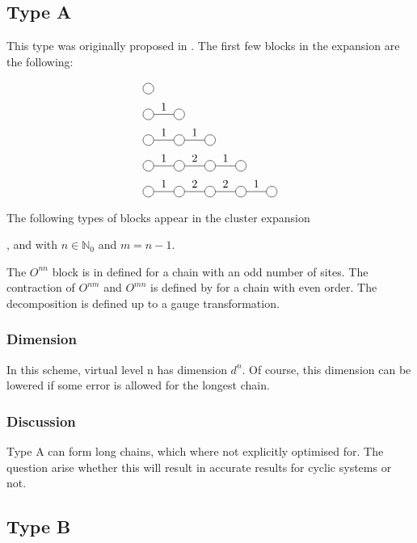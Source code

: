 
\subsection{Type A}
This type was originally proposed in \cite{Vanhecke2021}. The first few blocks in the expansion are the following:

\begin{equation}
    \begin{split}
        &\mpob{1}{ {,}  }{}{}{}{{,,}} \\
        &\mpob{2}{ {,"1",}  }{}{}{}{{,,}}\\
        &\mpob{3}{ {,"1","1",}  }{}{}{}{{,,,}}\\
        &\mpob{4}{ {,"1","2","1",}  }{}{}{}{{,,,,,}}\\
        &\mpob{5}{ {,"1","2","2","1",}  }{}{}{}{{,,,,,}}\\
    \end{split}
\end{equation}

The following types of blocks appear in the cluster expansion

, and  with $n \in \mathbb{N}_0$ and $m=n-1$.

The $O^{n n}$ block is in defined for a chain with an odd number of sites. The contraction of $O^{n m }$ and $O^{m n} $ is defined by for a chain with even order. The decomposition is defined up to a gauge transformation.

\subsubsection{Dimension}

In this scheme, virtual level n has dimension $d^n$. Of course, this dimension can be lowered if some error is allowed for the longest chain.

\subsubsection{Discussion}

Type A can form long chains, which where not explicitly optimised for. The question arise whether this will result in accurate results for cyclic systems or not.

\subsection{Type B}

